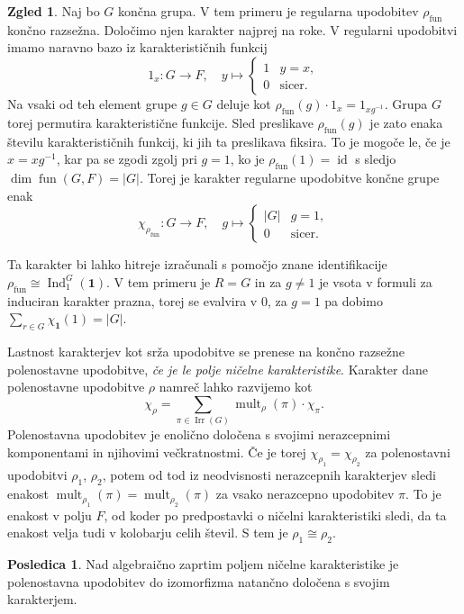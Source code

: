 \documentclass[11pt]{book}
\def\oneone{\mathbf{1}}
\DeclareMathOperator\Ind{Ind}
\DeclareMathOperator\mult{mult}
\DeclareMathOperator\Irr{Irr}
\DeclareMathOperator\fun{fun}
\DeclareMathOperator\id{id}
\theoremstyle{definition}
\theoremstyle{zgled}
\newtheorem{zgled}[theorem]{Zgled}
\theoremstyle{zgledbrezstevilke}
\theoremstyle{odprtproblem}
\theoremstyle{domacanaloga}
\theoremstyle{izrek}
\newtheorem{posledica}[theorem]{Posledica}
\begin{document}
\begin{zgled}
    Naj bo $G$ končna grupa. V tem primeru je regularna upodobitev $\rho_{\fun}$ končno razsežna. Določimo njen karakter najprej na roke. V regularni upodobitvi imamo naravno bazo iz karakterističnih funkcij
    \[
        1_{x} \colon G \to F, \quad
        y \mapsto \begin{cases} 1 & y = x, \\ 0 & \text{sicer.} \end{cases}
    \]
    Na vsaki od teh element grupe $g \in G$ deluje kot $\rho_{\fun}(g) \cdot 1_x = 1_{x g^{-1}}$. Grupa $G$ torej permutira karakteristične funkcije. Sled preslikave $\rho_{\fun}(g)$ je zato enaka številu karakterističnih funkcij, ki jih ta preslikava fiksira. To je mogoče le, če je $x = x g^{-1}$, kar pa se zgodi zgolj pri $g = 1$, ko je $\rho_{\fun}(1) = \id$ s sledjo $\dim \fun(G,F) = |G|$. Torej je karakter regularne upodobitve končne grupe enak
    \[
        \chi_{\rho_{\fun}} \colon G \to F, \quad
        g \mapsto \begin{cases} |G| & g = 1, \\ 0 & \text{sicer.} \end{cases}
    \]
    
    Ta karakter bi lahko hitreje izračunali s pomočjo znane identifikacije $\rho_{\fun} \cong \Ind^G_1(\oneone)$. V tem primeru je $R = G$ in za $g \neq 1$ je vsota v formuli za induciran karakter prazna, torej se evalvira v $0$, za $g = 1$ pa dobimo $\sum_{r \in G} \chi_{\oneone}(1) = |G|$.
\end{zgled}

Lastnost karakterjev kot srža upodobitve se prenese na končno razsežne polenostavne upodobitve, \emph{če je le polje ničelne karakteristike}. Karakter dane polenostavne upodobitve $\rho$ namreč lahko razvijemo kot
\[
    \textstyle \chi_{\rho} = \sum_{\pi \in \Irr(G)} \mult_{\rho}(\pi) \cdot \chi_{\pi}.
\]
Polenostavna upodobitev je enolično določena s svojimi nerazcepnimi komponentami in njihovimi večkratnostmi. Če je torej $\chi_{\rho_1} = \chi_{\rho_2}$ za polenostavni upodobitvi $\rho_1$, $\rho_2$, potem od tod iz neodvisnosti nerazcepnih karakterjev sledi enakost $\mult_{\rho_1}(\pi) = \mult_{\rho_2}(\pi)$ za vsako nerazcepno upodobitev $\pi$. To je enakost v polju $F$, od koder po predpostavki o ničelni karakteristiki sledi, da ta enakost velja tudi v kolobarju celih števil. S tem je $\rho_1 \cong \rho_2$.

\begin{posledica}
Nad algebraično zaprtim poljem ničelne karakteristike je polenostavna upodobitev do izomorfizma natančno določena s svojim karakterjem.
\end{posledica}
\end{document}
